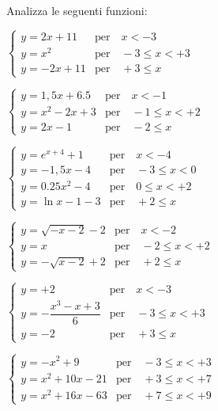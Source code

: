 \begin{esercizio}\label{ese:stufun.8e}
Analizza le seguenti funzioni:
\begin{multicols}{2}
 \begin{enumeratea}
  \item 
\(\begin{cases}
y = 2x+11 & \text{per} \quad x < -3 \\
y = x^2 & \text{per} \quad -3 \leq x < +3\\
y = -2x+11 & \text{per} \quad +3 \leq x
\end{cases} \) \\ %
  \item 
\(\begin{cases}
y = 1,5x+6.5 & \text{per} \quad x < -1 \\
y = x^2-2x+3 & \text{per} \quad -1 \leq x < +2\\
y = 2x-1 & \text{per} \quad -2 \leq x
\end{cases} \) \\ %
  \item 
\(\begin{cases}
y = e^{x+4}+1 & \text{per} \quad x < -4 \\
y = -1,5x -4 & \text{per} \quad -3 \leq x < 0\\
y = 0.25x^2-4 & \text{per} \quad 0 \leq x < +2\\
y = \ln{x-1} -3 & \text{per} \quad +2 \leq x
\end{cases} \) \\ %
  \item 
\(\begin{cases}
y = \sqrt{-x-2}-2 & \text{per} \quad x < -2 \\
y = x & \text{per} \quad -2 \leq x < +2\\
y = -\sqrt{x-2}+2 & \text{per} \quad +2 \leq x
\end{cases} \) \\ %
  \item 
\(\begin{cases}
y = +2 & \text{per} \quad x < -3 \\
y = -\dfrac{x^3-x+3}{6} & \text{per} \quad -3 \leq x < +3\\
y = -2 & \text{per} \quad +3 \leq x
\end{cases} \) \\ [1em] %
  \item 
\(\begin{cases}
y = -x^2+9 & \text{per} \quad -3 \leq x < +3 \\
y = x^2+10x-21 & \text{per} \quad +3 \leq x < +7\\
y = x^2+16x-63 & \text{per} \quad +7 \leq x < +9
\end{cases} \) \\ %
 \end{enumeratea}
\end{multicols}
\end{esercizio}

